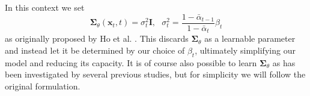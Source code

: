 \documentclass{report}
\begin{document}
In this context we set
\begin{equation} \label{eq:sigma}
    \bm{\Sigma}_{\theta}(\bm{x}_t, t) = \sigma_t^2\bm{I}, \ \ \ \sigma_t^2 = \frac{1-    \bar{\alpha}_{t-1}}{1-\bar{\alpha}_t}\beta_t    
\end{equation}
as originally proposed by Ho et al. \cite{ho2020denoising}. This discards $\bm{\Sigma}_{\theta}$ as a learnable parameter and instead let it be determined by our choice of $\beta_t$, ultimately simplifying our model and reducing its capacity. It is of course also possible to learn $\bm{\Sigma}_{\theta}$ as has been investigated by several previous studies, but for simplicity we will follow the original formulation.
\end{document}
